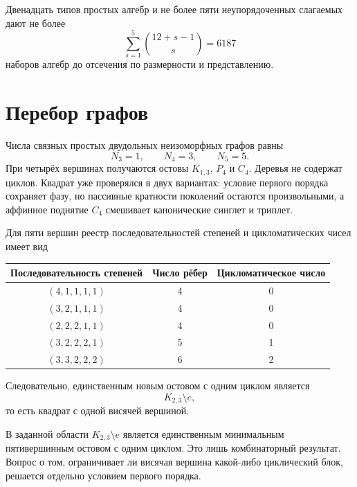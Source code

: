 Двенадцать типов простых алгебр и не более пяти неупорядоченных слагаемых
дают не более
\begin{equation}
 \sum_{s=1}^{5}\binom{12+s-1}{s}=6187
\end{equation}
наборов алгебр до отсечения по размерности и представлению.

\section{Перебор графов}

Числа связных простых двудольных неизоморфных графов равны
\begin{equation}
 N_3=1,\qquad N_4=3,\qquad N_5=5.
\end{equation}
При четырёх вершинах получаются остовы \(K_{1,3}\), \(P_4\) и \(C_4\).
Деревья не содержат циклов. Квадрат уже проверялся в двух вариантах:
условие первого порядка сохраняет фазу, но пассивные кратности поколений
остаются произвольными, а аффинное поднятие \(C_4\) смешивает канонические
синглет и триплет.

Для пяти вершин реестр последовательностей степеней и цикломатических чисел
имеет вид
\begin{center}
\small
\begin{tabular}{ccc}
\toprule
Последовательность степеней & Число рёбер & Цикломатическое число\\
\midrule
\((4,1,1,1,1)\) & 4 & 0\\
\((3,2,1,1,1)\) & 4 & 0\\
\((2,2,2,1,1)\) & 4 & 0\\
\((3,2,2,2,1)\) & 5 & 1\\
\((3,3,2,2,2)\) & 6 & 2\\
\bottomrule
\end{tabular}
\end{center}

Следовательно, единственным новым остовом с одним циклом является
\begin{equation}
 K_{2,3}\setminus e,
\end{equation}
то есть квадрат с одной висячей вершиной.

\begin{proposition}
В заданной области \(K_{2,3}\setminus e\) является единственным минимальным
пятивершинным остовом с одним циклом. Это лишь комбинаторный результат.
Вопрос о том, ограничивает ли висячая вершина какой-либо циклический блок,
решается отдельно условием первого порядка.
\end{proposition}

